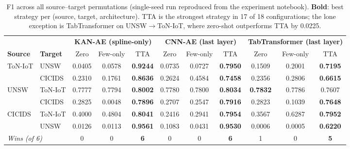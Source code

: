 \begin{table}[t]
\centering
\caption{F1 across all source--target permutations (single-seed run reproduced from the experiment notebook).
  \textbf{Bold}: best strategy per (source, target, architecture).
  TTA is the strongest strategy in 17 of 18 configurations; the lone exception is TabTransformer on UNSW$\rightarrow$ToN-IoT, where zero-shot outperforms TTA by 0.0225.}
\label{tab:main_results}
\begin{tabular}{l|l|ccc|ccc|ccc}
\toprule
& & \multicolumn{3}{c|}{\textbf{KAN-AE (spline-only)}} & \multicolumn{3}{c|}{\textbf{CNN-AE (last layer)}} & \multicolumn{3}{c}{\textbf{TabTransformer (last layer)}} \\
\textbf{Source} & \textbf{Target} & Zero & Few-only & TTA & Zero & Few-only & TTA & Zero & Few-only & TTA \\
\midrule
\multirow{2}{*}{ToN-IoT}
    & UNSW    & 0.0405 & 0.0578 & \textbf{0.9244} & 0.0735 & 0.0727 & \textbf{0.7950} & 0.1509 & 0.2001 & \textbf{0.7195} \\
    & CICIDS  & 0.2310 & 0.1761 & \textbf{0.8636} & 0.2624 & 0.4584 & \textbf{0.7458} & 0.2356 & 0.2806 & \textbf{0.6615} \\
\midrule
\multirow{2}{*}{UNSW}
    & ToN-IoT & 0.7777 & 0.7794 & \textbf{0.8002} & 0.7780 & 0.7800 & \textbf{0.8034} & \textbf{0.7832} & 0.7786 & 0.7607 \\
    & CICIDS  & 0.2825 & 0.0048 & \textbf{0.7896} & 0.2707 & 0.2547 & \textbf{0.7916} & 0.2823 & 0.1039 & \textbf{0.7648} \\
\midrule
\multirow{2}{*}{CICIDS}
    & ToN-IoT & 0.4000 & 0.4804 & \textbf{0.8041} & 0.2416 & 0.2941 & \textbf{0.7954} & 0.3567 & 0.6287 & \textbf{0.7952} \\
    & UNSW    & 0.0126 & 0.0113 & \textbf{0.9561} & 0.1083 & 0.0431 & \textbf{0.9530} & 0.0006 & 0.0005 & \textbf{0.6220} \\
\midrule
\multicolumn{2}{l|}{\textit{Wins (of 6)}} & 0 & 0 & \textbf{6} & 0 & 0 & \textbf{6} & 1 & 0 & \textbf{5} \\
\bottomrule
\end{tabular}
\end{table}

